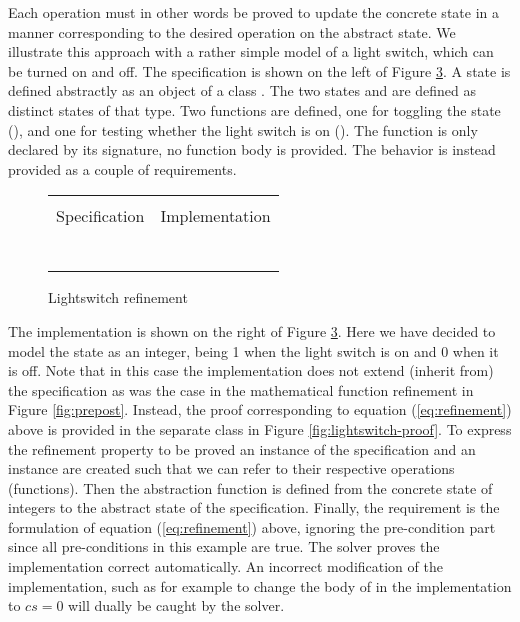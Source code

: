 \noindent
Each operation must in other words be proved to update the concrete state
in a manner corresponding to the desired operation on the abstract state.
We illustrate this approach with a rather simple \Klang{} model of a light switch,
which can be turned on and off.  The specification is shown on the left of
Figure \ref{fig:lightswitch}. A state is defined abstractly as an object of 
a class . The two states  and  are defined as 
distinct states of that type. Two functions are defined, one for toggling
the state (), and one for testing whether the light switch is on
(). The  function is only declared by its signature, no 
function body is provided. The behavior is instead provided  as a couple of
requirements.

\begin{figure}
  \centering
  \begin{tabular}[c]{c|c}
    \hline \\
    Specification & Implementation \\
    \hline\hline \\ \\
    \begin{subfigure}[c]{0.5\textwidth}
     
      \label{fig:lightswitch1}
    \end{subfigure}
    &
    \begin{subfigure}[c]{0.5\textwidth}
      
      \label{fig:lightswicth2}
    \end{subfigure}
    \\ \\
    \hline
  \end{tabular}    
  \caption{Lightswitch refinement}
  \label{fig:lightswitch}
\end{figure}

The implementation is shown on the right of Figure \ref{fig:lightswitch}.
Here we have decided to model the state as an integer, being 1 when the light 
switch is on and 0 when it is off. Note that in this case the implementation
does not extend (inherit from) the specification as was the case in the 
mathematical function refinement in Figure \ref{fig:prepost}. Instead, the
proof corresponding to equation (\ref{eq:refinement}) above is provided
in the separate class  in Figure \ref{fig:lightswitch-proof}.
To express the refinement property to be proved an instance  of the
specification and an instance  are created such that we can refer to their respective operations (functions). Then the abstraction function  is defined from the concrete state of integers to the abstract state 
of the specification. Finally, the requirement is the \Klang{} formulation of 
equation (\ref{eq:refinement}) above, ignoring the pre-condition part since all
pre-conditions in this example are true. The \Klang{} solver proves the
implementation correct automatically. An incorrect modification of the implementation, such as for example to change the body of  in 
the implementation to $cs = 0$ will dually be caught by the solver.


